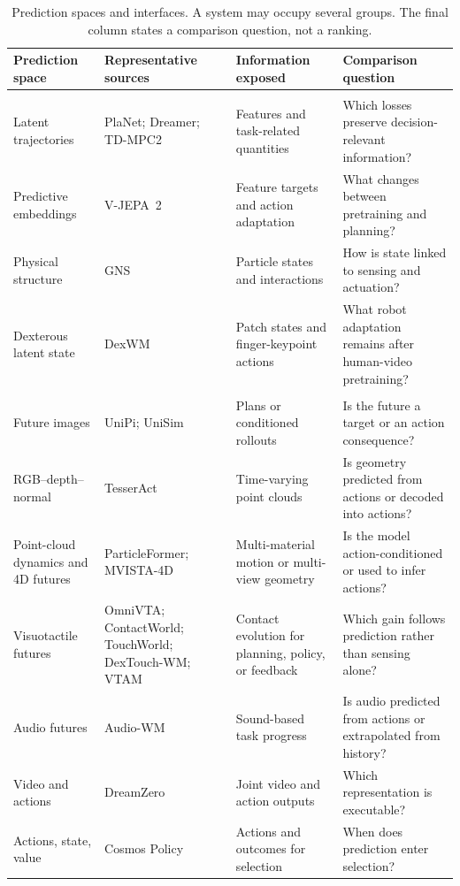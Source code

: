 \begin{table}[H]
\caption{Prediction spaces and interfaces. A system may occupy several groups. The final column states a comparison question, not a ranking.}
\label{tab:model-spaces}
\small
\begin{tabularx}{\linewidth}{@{}>{\raggedright\arraybackslash}p{.16\linewidth}YYY@{}}
\toprule
Prediction space & Representative sources & Information exposed & Comparison question \\
\midrule
{} \\
Latent trajectories & PlaNet; Dreamer; TD-MPC2~\cite{hafner2019planet,hafner2020dreamer,hansen2024tdmpc2} & Features and task-related quantities & Which losses preserve decision-relevant information? \\
\addlinespace
Predictive embeddings & V-JEPA~2~\cite{assran2025vjepa2} & Feature targets and action adaptation & What changes between pretraining and planning? \\
\addlinespace
Physical structure & GNS~\cite{sanchez2020gns} & Particle states and interactions & How is state linked to sensing and actuation? \\
\addlinespace
Dexterous latent state & DexWM~\cite{goswami2025dexwm} & Patch states and finger-keypoint actions & What robot adaptation remains after human-video pretraining? \\
\midrule
{} \\
Future images & UniPi; UniSim~\cite{du2023unipi,yang2024unisim} & Plans or conditioned rollouts & Is the future a target or an action consequence? \\
\addlinespace
RGB--depth--normal & TesserAct~\cite{zhen2025tesseract} & Time-varying point clouds & Is geometry predicted from actions or decoded into actions? \\
\addlinespace
Point-cloud dynamics and 4D futures & ParticleFormer; MVISTA-4D~\cite{huang2025particleformer,wang2026mvista4d} & Multi-material motion or multi-view geometry & Is the model action-conditioned or used to infer actions? \\
\addlinespace
Visuotactile futures & OmniVTA; ContactWorld; TouchWorld; DexTouch-WM; VTAM~\cite{zheng2026omnivta,zhang2026contactworld,zhou2026touchworld,qin2026dextouch,yuan2026vtam} & Contact evolution for planning, policy, or feedback & Which gain follows prediction rather than sensing alone? \\
\addlinespace
Audio futures & Audio-WM~\cite{zhang2025audiowm} & Sound-based task progress & Is audio predicted from actions or extrapolated from history? \\
\addlinespace
Video and actions & DreamZero~\cite{ye2026dreamzero} & Joint video and action outputs & Which representation is executable? \\
\addlinespace
Actions, state, value & Cosmos Policy~\cite{kim2026cosmospolicy} & Actions and outcomes for selection & When does prediction enter selection? \\
\bottomrule
\end{tabularx}
\end{table}

